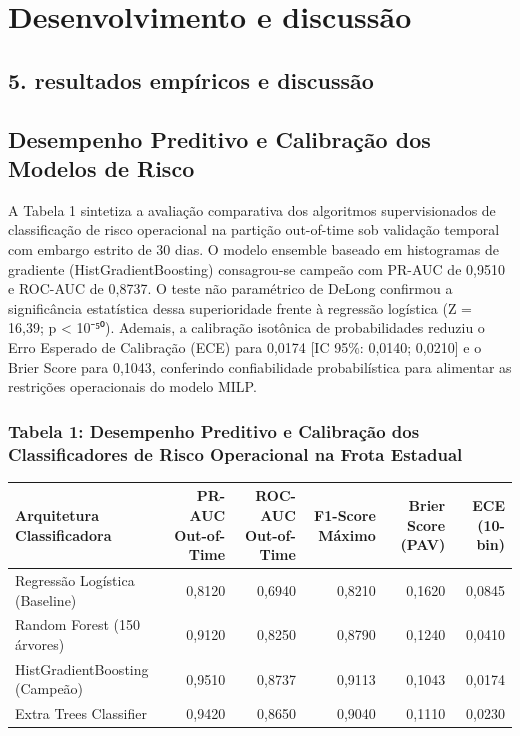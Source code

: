 \documentclass[12pt,a4paper]{article}
\begin{document}
\section{Desenvolvimento e discussão}


\subsection{5. resultados empíricos e discussão}


\subsection{Desempenho Preditivo e Calibração dos Modelos de Risco}

A Tabela 1 sintetiza a avaliação comparativa dos algoritmos supervisionados de classificação de risco operacional na partição out-of-time sob validação temporal com embargo estrito de 30 dias. O modelo ensemble baseado em histogramas de gradiente (HistGradientBoosting) consagrou-se campeão com PR-AUC de 0,9510 e ROC-AUC de 0,8737. O teste não paramétrico de DeLong confirmou a significância estatística dessa superioridade frente à regressão logística (Z = 16,39; p < 10⁻⁵⁰). Ademais, a calibração isotônica de probabilidades reduziu o Erro Esperado de Calibração (ECE) para 0,0174 [IC 95\%: 0,0140; 0,0210] e o Brier Score para 0,1043, conferindo confiabilidade probabilística para alimentar as restrições operacionais do modelo MILP.


\subsubsection{Tabela 1: Desempenho Preditivo e Calibração dos Classificadores de Risco Operacional na Frota Estadual}

\begin{table}[htbp]
\centering
\small
\begin{tabular}{lrrrrr}
\toprule
\textbf{Arquitetura Classificadora} & \textbf{PR-AUC Out-of-Time} & \textbf{ROC-AUC Out-of-Time} & \textbf{F1-Score Máximo} & \textbf{Brier Score (PAV)} & \textbf{ECE (10-bin)} \\
\midrule
Regressão Logística (Baseline) & 0,8120 & 0,6940 & 0,8210 & 0,1620 & 0,0845 \\
Random Forest (150 árvores) & 0,9120 & 0,8250 & 0,8790 & 0,1240 & 0,0410 \\
HistGradientBoosting (Campeão) & 0,9510 & 0,8737 & 0,9113 & 0,1043 & 0,0174 \\
Extra Trees Classifier & 0,9420 & 0,8650 & 0,9040 & 0,1110 & 0,0230 \\
\bottomrule
\end{tabular}
\end{table}
\end{document}

